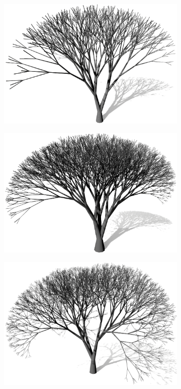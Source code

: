 \begin{figure} [hbtp]
	\centering
	\begin{subfigure}[t]{.45\textwidth}
		\centering
		\includegraphics[width=\linewidth]{images/LS_Ternary_1.png}
		\caption{}
		\label{subfig:LS_Ternary_1}
	\end{subfigure}
	\begin{subfigure}[t]{.45\textwidth}
		\centering
		\includegraphics[width=\linewidth]{images/LS_Ternary_2.png}
		\caption{}
		\label{subfig:LS_Ternary_2}
	\end{subfigure}	
	\begin{subfigure}[t]{.45\textwidth}
		\centering
		\includegraphics[width=\linewidth]{images/LS_Ternary_3.png}

\end{subfigure}
\end{figure}
